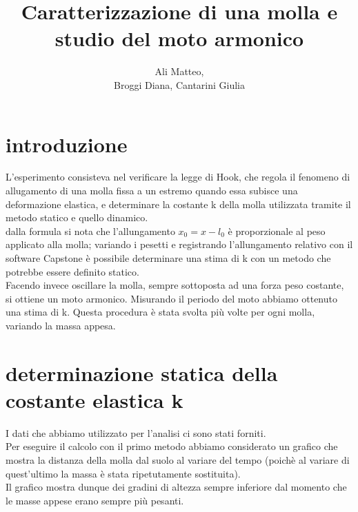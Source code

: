 \documentclass[a4paper]{article}
\title{Caratterizzazione di una molla e studio del moto armonico}
\author{Ali Matteo,\\Broggi Diana, Cantarini Giulia}
\date{ }
\theoremstyle{definition}
\begin{document}
	\maketitle
	\section*{introduzione}
	L'esperimento consisteva nel verificare la legge di Hook, che regola il fenomeno di allugamento di una molla fissa a un estremo quando essa subisce una deformazione elastica, e determinare la costante k della molla utilizzata tramite il metodo statico e quello dinamico.\\
	dalla formula si nota che l'allungamento \(x_{0} = x - l_{0}\) è proporzionale al peso applicato alla molla; variando i pesetti e registrando l'allungamento relativo con il software Capstone è possibile determinare una stima di k con un metodo che potrebbe essere definito statico.\\
	Facendo invece oscillare la molla, sempre sottoposta ad una forza peso costante, si ottiene un moto armonico. Misurando il periodo del moto abbiamo ottenuto una stima di k. Questa procedura è stata svolta più volte per ogni molla, variando la massa appesa.
	
	\section*{determinazione statica della costante elastica k}
	I dati che abbiamo utilizzato per l'analisi ci sono stati forniti.\\
		Per eseguire il calcolo con il primo metodo abbiamo considerato un grafico che mostra la distanza della molla dal suolo al variare del tempo (poichè al variare di quest'ultimo la massa è stata ripetutamente sostituita).\\
		Il grafico mostra dunque dei gradini di altezza sempre inferiore dal momento che le masse appese erano sempre più pesanti. \\\\\\\\\\\\\\\\\\\\\\\\\\
		
\end{document}
